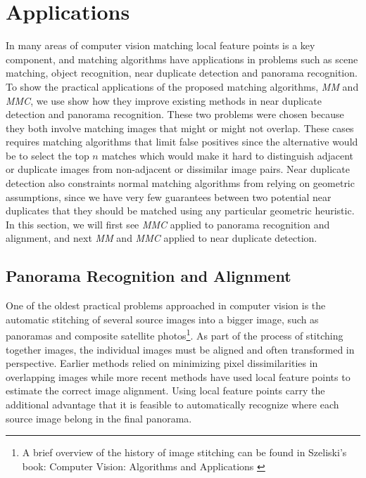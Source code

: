 \chapter{Applications}
\label{C:Applications}

In many areas of computer vision matching local feature points is a key 
component, and matching algorithms have applications in problems such as
scene matching, object recognition, near duplicate detection and 
panorama recognition. To show the practical applications of the proposed 
matching algorithms, \emph{MM} and \emph{MMC}, we use show how they 
improve existing methods in near duplicate detection and panorama 
recognition. These two problems were chosen because they both involve 
matching images that might or might not overlap. These cases requires 
matching algorithms that limit false positives since the alternative 
would be to select the top $n$ matches which would make it hard to 
distinguish adjacent or duplicate images from non-adjacent or dissimilar
image pairs. Near duplicate detection also constraints normal matching 
algorithms from relying on geometric assumptions, since we have very few
guarantees between two potential near duplicates that they should be 
matched using any particular geometric heuristic. In this section, we 
will first see \emph{MMC} applied to panorama recognition and alignment,
and next \emph{MM} and \emph{MMC} applied to near duplicate detection.


\section{Panorama Recognition and Alignment}
One of the oldest practical problems approached in computer vision is 
the automatic stitching of several source images into a bigger image, 
such as panoramas and composite satellite photos\footnote{A brief 
overview of the history of image stitching can be found in Szeliski's 
book: Computer Vision: Algorithms and Applications \cite{szeliski2010}}.  
As part of the process of stitching together images, the individual 
images must be aligned and often transformed in perspective. Earlier 
methods relied on minimizing pixel dissimilarities in overlapping images 
while more recent methods have used local feature points to estimate the 
correct image alignment. Using local feature points carry the additional 
advantage that it is feasible to automatically recognize where each 
source image belong in the final panorama.

